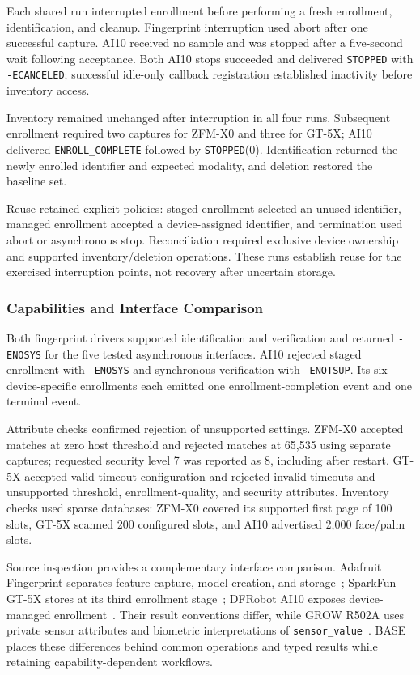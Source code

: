 Each shared run interrupted enrollment before performing a fresh enrollment, identification, and cleanup. Fingerprint interruption used abort after one successful capture. AI10 received no sample and was stopped after a five-second wait following acceptance. Both AI10 stops succeeded and delivered \texttt{STOPPED} with \texttt{-ECANCELED}; successful idle-only callback registration established inactivity before inventory access.

Inventory remained unchanged after interruption in all four runs. Subsequent enrollment required two captures for ZFM-X0 and three for GT-5X; AI10 delivered \texttt{ENROLL\_COMPLETE} followed by \texttt{STOPPED}(0). Identification returned the newly enrolled identifier and expected modality, and deletion restored the baseline set.

Reuse retained explicit policies: staged enrollment selected an unused identifier, managed enrollment accepted a device-assigned identifier, and termination used abort or asynchronous stop. Reconciliation required exclusive device ownership and supported inventory/deletion operations. These runs establish reuse for the exercised interruption points, not recovery after uncertain storage.

\subsubsection{Capabilities and Interface Comparison}
\label{sec:eval_interface_comparison}

Both fingerprint drivers supported identification and verification and returned \texttt{-ENOSYS} for the five tested asynchronous interfaces. AI10 rejected staged enrollment with \texttt{-ENOSYS} and synchronous verification with \texttt{-ENOTSUP}. Its six device-specific enrollments each emitted one enrollment-completion event and one terminal event.

Attribute checks confirmed rejection of unsupported settings. ZFM-X0 accepted matches at zero host threshold and rejected matches at 65,535 using separate captures; requested security level 7 was reported as 8, including after restart. GT-5X accepted valid timeout configuration and rejected invalid timeouts and unsupported threshold, enrollment-quality, and security attributes. Inventory checks used sparse databases: ZFM-X0 covered its supported first page of 100 slots, GT-5X scanned 200 configured slots, and AI10 advertised 2,000 face/palm slots.

Source inspection provides a complementary interface comparison. Adafruit Fingerprint separates feature capture, model creation, and storage~\cite{adafruit_fingerprint_library}; SparkFun GT-5X stores at its third enrollment stage~\cite{sparkfun_gt5x_family}; DFRobot AI10 exposes device-managed enrollment~\cite{dfrobot_ai10_library}. Their result conventions differ, while GROW R502A uses private sensor attributes and biometric interpretations of \texttt{sensor\_value}~\cite{zephyr_r502a}. BASE places these differences behind common operations and typed results while retaining capability-dependent workflows.

